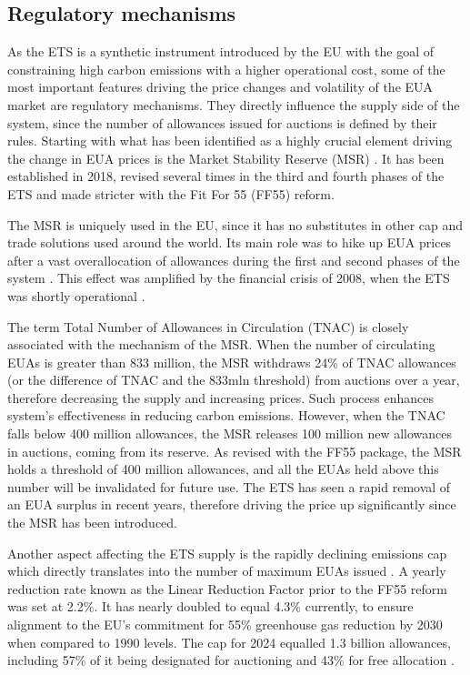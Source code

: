\documentclass[12pt, letterpaper]{article}
\begin{document}
\subsection{Regulatory mechanisms}

As the ETS is a synthetic instrument introduced by the EU with the goal of constraining high carbon emissions with a higher operational cost, some of the most important features driving the price changes and volatility of the EUA market are regulatory mechanisms. They directly influence the supply side of the system, since the number of allowances issued for auctions is defined by their rules. Starting with what has been identified as a highly crucial element driving the change in EUA prices is the Market Stability Reserve (MSR) \parencite{borghesi2023}. It has been established in 2018, revised several times in the third and fourth phases of the ETS and made stricter with the Fit For 55 (FF55) reform.

The MSR is uniquely used in the EU, since it has no substitutes in other cap and trade solutions used around the world. Its main role was to hike up EUA prices after a vast overallocation of allowances during the first and second phases of the system \parencite{borghesi2023, salvagnin2024}. This effect was amplified by the financial crisis of 2008, when the ETS was shortly operational \parencite{borghesi2023}. 

The term Total Number of Allowances in Circulation (TNAC) is closely associated with the mechanism of the MSR. When the number of circulating EUAs is greater than 833 million, the MSR withdraws 24\% of TNAC allowances (or the difference of TNAC and the 833mln threshold) from auctions over a year, therefore decreasing the supply and increasing prices. Such process enhances system’s effectiveness in reducing carbon emissions. However, when the TNAC falls below 400 million allowances, the MSR releases 100 million new allowances in auctions, coming from its reserve. As revised with the FF55 package, the MSR holds a threshold of 400 million allowances, and all the EUAs held above this number will be invalidated for future use. The ETS has seen a rapid removal of an EUA surplus in recent years, therefore driving the price up significantly since the MSR has been introduced. 

Another aspect affecting the ETS supply is the rapidly declining emissions cap which directly translates into the number of maximum EUAs issued \parencite{ec_ets}. A yearly reduction rate known as the Linear Reduction Factor prior to the FF55 reform was set at 2.2\%. It has nearly doubled to equal 4.3\% currently, to ensure alignment to the EU’s commitment for 55\% greenhouse gas reduction by 2030 when compared to 1990 levels. The cap for 2024 equalled 1.3 billion allowances, including 57\% of it being designated for auctioning and 43\% for free allocation \parencite{ec_ets}. 
\end{document}

